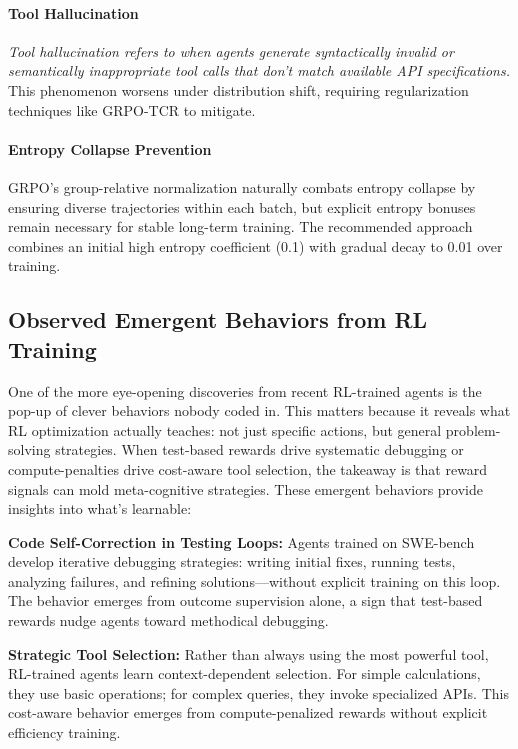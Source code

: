 \documentclass[12pt,a4paper]{report}
\theoremstyle{definition}
\begin{document}
\paragraph{Tool Hallucination} \textit{Tool hallucination refers to when agents generate syntactically invalid or semantically inappropriate tool calls that don't match available API specifications.} This phenomenon worsens under distribution shift, requiring regularization techniques like GRPO-TCR to mitigate.

\paragraph{Entropy Collapse Prevention} GRPO's group-relative normalization naturally combats entropy collapse by ensuring diverse trajectories within each batch, but explicit entropy bonuses remain necessary for stable long-term training. The recommended approach combines an initial high entropy coefficient (0.1) with gradual decay to 0.01 over training.

\subsection{Observed Emergent Behaviors from RL Training}
\label{sec:emergent}

One of the more eye-opening discoveries from recent RL-trained agents is the pop-up of clever behaviors nobody coded in. This matters because it reveals what RL optimization actually teaches: not just specific actions, but general problem-solving strategies. When test-based rewards drive systematic debugging or compute-penalties drive cost-aware tool selection, the takeaway is that reward signals can mold meta-cognitive strategies. These emergent behaviors provide insights into what's learnable:

\textbf{Code Self-Correction in Testing Loops:} Agents trained on SWE-bench develop iterative debugging strategies: writing initial fixes, running tests, analyzing failures, and refining solutions---without explicit training on this loop. The behavior emerges from outcome supervision alone, a sign that test-based rewards nudge agents toward methodical debugging.

\textbf{Strategic Tool Selection:} Rather than always using the most powerful tool, RL-trained agents learn context-dependent selection. For simple calculations, they use basic operations; for complex queries, they invoke specialized APIs. This cost-aware behavior emerges from compute-penalized rewards without explicit efficiency training.
\end{document}
